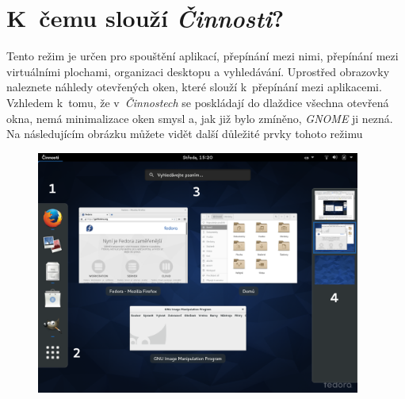 \section*{K~čemu slouží \emph{Činnosti}?}
Tento režim je určen pro spouštění aplikací, přepínání mezi nimi, přepínání mezi virtuálními plochami, organizaci desktopu a vyhledávání. Uprostřed obrazovky naleznete náhledy otevřených oken, které slouží k~přepínání mezi aplikacemi. Vzhledem k~tomu, že v~\emph{Činnostech} se poskládají do dlaždice všechna otevřená okna, nemá minimalizace oken smysl a, jak již bylo zmíněno, \emph{GNOME} ji nezná. Na následujícím obrázku můžete vidět další důležité prvky tohoto režimu

\begin{figure}[h]
\begin{center}
\includegraphics[width=0.95\textwidth]{img/shell-b}
 \label{fig:shell-b}
\end{center}
\end{figure}

